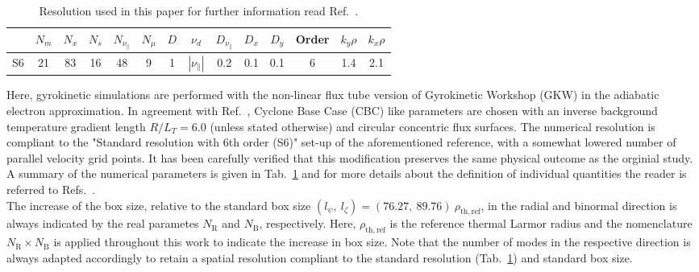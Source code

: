 \documentclass[aip, amsmath, amssymb, reprint, twocolumn]{revtex4-1}
\begin{document}
\begin{table}[ht]
	\begin{ruledtabular}
		\begin{tabular}{l | ccccc | ccccc | c | cc}
			& $N_m$ & $N_x$ & $N_s$ & $N_{\nu_\parallel}$ & $N_\mu$ & $D$ & $\nu_d$           & $D_{\nu_\parallel}$ & $D_x$ & $D_y$ & Order & $k_y\rho$ & $k_x\rho$ \\
			\hline
			S6   & 21    & 83    & 16    & 48                  & 9       & 1   & $|\nu_\parallel|$ & 0.2                 & 0.1   & 0.1   & 6     & 1.4       & 2.1       \\
		\end{tabular}
	\end{ruledtabular}
	\caption{
		Resolution used in this paper for further information read Ref.~\cite{peeters2016}. %
	}
	\label{tab:resolution}
\end{table}

Here, gyrokinetic simulations are performed with the non-linear flux tube version of Gyrokinetic Workshop (GKW) \cite{peeters2009} in the adiabatic electron approximation.
In agreement with Ref.~\cite{peeters2016}, Cyclone Base Case (CBC) like parameters are chosen with an inverse background temperature gradient length $R/L_T = 6.0$ (unless stated otherwise) and circular concentric flux surfaces. 
The numerical resolution is compliant to the "Standard resolution with 6th order (S6)" set-up of the aforementioned reference, with a somewhat lowered number of parallel velocity grid points.
It has been carefully verified that this modification preserves the same physical outcome as the orginial study.
A summary of the numerical parameters is given in Tab.~\ref{tab:resolution} and for more details about the definition of individual quantities the reader is referred to Refs.~\cite{peeters2009, peeters2016}. \\
The increase of the box size, relative to the standard box size $(l_\psi,~l_\zeta) = (76.27,~89.76)~\rho_\mathrm{th,ref}$, in the radial and binormal direction is always indicated by the real parametes $N_\mathrm{R}$ and $N_\mathrm{B}$, respectively.
Here, $\rho_\mathrm{th,ref}$ is the reference thermal Larmor radius and the nomenclature $N_\mathrm{R}\times N_\mathrm{B}$ is applied throughout this work to indicate the increase in box size.  
Note that the number of modes in the respective direction is always adapted accordingly to retain a spatial resolution compliant to the standard resolution (Tab.~\ref{tab:resolution}) and standard box size. \bigskip
  
\end{document}
